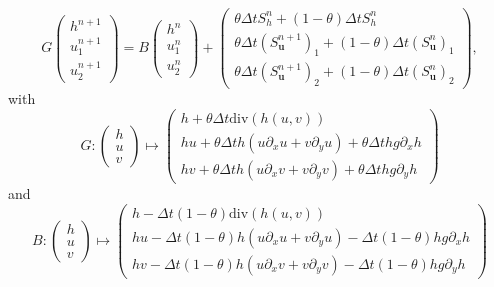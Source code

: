\documentclass[a4paper, 11pt]{article}
\begin{document}
\begin{equation*}
G\begin{pmatrix}h^{n+1}\\u_1^{n+1}\\u_2^{n+1}\end{pmatrix}=B\begin{pmatrix}h^n\\u_1^n\\u_2^n\end{pmatrix}+\begin{pmatrix}\theta \Delta tS_h^n+(1-\theta)\Delta tS_h^{n}\\ \theta \Delta t\left(S_{\boldsymbol{u}}^{n+1}\right)_1+(1-\theta)\Delta t\left(S_{\boldsymbol{u}}^n\right)_1\\ \theta \Delta t\left(S_{\boldsymbol{u}}^{n+1}\right)_2+(1-\theta)\Delta t\left(S_{\boldsymbol{u}}^n\right)_2\end{pmatrix},
\end{equation*}
with 
\begin{equation*}
G:\begin{pmatrix}h\\u\\v\end{pmatrix}\mapsto\begin{pmatrix}h+\theta\Delta t\text{div}\left(h(u,v)\right)\\
hu+\theta\Delta t h\left(u\partial_xu+v\partial_yu\right)+\theta \Delta thg\partial_x h\\
hv+\theta\Delta t h\left(u\partial_xv+v\partial_yv\right)+\theta \Delta thg\partial_y h
\end{pmatrix}
\end{equation*}
and
\begin{equation*}
B:
\begin{pmatrix}
h\\u\\v
\end{pmatrix}\mapsto\begin{pmatrix}h-\Delta t(1-\theta)\text{div}(h(u,v))\\
hu-\Delta t(1-\theta)h\left(u\partial_xu+v\partial_yu\right)-\Delta t(1-\theta)hg\partial_x h\\
hv-\Delta t(1-\theta)h\left(u\partial_xv+v\partial_yv\right)-\Delta t(1-\theta)hg\partial_y h
\end{pmatrix}
\end{equation*}
\end{document}
